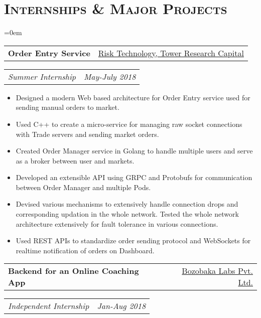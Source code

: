 \documentclass{article}
\makeatletter
\newcommand{\headerrow}[2]
{\begin{tabular*}{\linewidth}{l@{\extracolsep{\fill}}r}
	#1 &
	#2 \\
\end{tabular*}}
\newcommand{\tmpsection}[1]{}
\let\tmpsection=\section
\renewcommand{\section}[1]{\tmpsection*{\textsc{#1}}}
\makeatother
\begin{document}
\section{Internships \& Major Projects}
\begin{list} {}{\leftmargin=0em}
\setlength{\leftmargin}{0pt}

    \item[]
    \headerrow {\textbf{Order Entry Service}}{\underline{Risk Technology, Tower Research Capital}}
    \headerrow {\emph{Summer Internship}}{\emph{May-July 2018}}
    \begin{itemize}
    \setlength\itemsep{0.0em}
	\item Designed a modern Web based architecture for Order Entry service used for sending manual orders to market.
	\item Used C++ to create a micro-service for managing raw socket connections with Trade servers and sending market orders. 
	\item Created Order Manager service in Golang to handle multiple users and serve as a broker between user and markets.
	\item Developed an extensible API using GRPC and Protobufs for communication between Order Manager and multiple Pods.
	\item Devised various mechanisms to extensively handle connection drops and corresponding updation in the whole network. Tested the whole network architecture extensively for fault tolerance in various connections.
    \item Used REST APIs to standardize order sending protocol and WebSockets for realtime notification of orders on Dashboard.
    \end{itemize}
    \item[]
    \headerrow {\textbf{Backend for an Online Coaching App}}{\underline{Bozobaka Labs Pvt. Ltd.}}
    \headerrow {\emph{Independent Internship}}{\emph{Jan-Aug 2018}}
    \begin{itemize}

\end{itemize}
\end{list}
\end{document}
